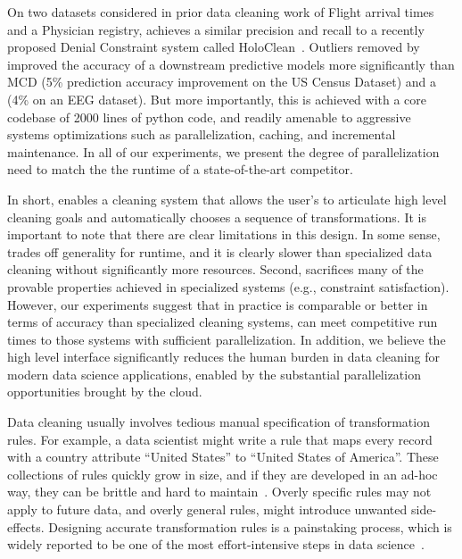 On two datasets considered in prior data cleaning work of Flight arrival times and a Physician registry, \sys achieves a similar precision and recall to a recently proposed Denial Constraint system called HoloClean~\cite{rekatsinas2017holoclean}. 
Outliers removed by \sys  improved the accuracy of a downstream predictive models more significantly than MCD (5\% prediction accuracy improvement on the US Census Dataset) and a (4\% on an EEG dataset). 
But more importantly, this is achieved with a core codebase of 2000 lines of python code, and readily amenable to aggressive systems optimizations such as parallelization, caching, and incremental maintenance.
In all of our experiments, we present the degree of parallelization need to match the the runtime of a state-of-the-art competitor.

In short, \sys enables a cleaning system that allows the user's to articulate high level cleaning goals and automatically chooses a sequence of transformations.  
It is important to note that there are clear limitations in this design.
In some sense, \sys trades off generality for runtime, and it is clearly slower than specialized data cleaning without significantly more resources.
Second, \sys sacrifices many of the provable properties achieved in specialized systems (e.g., constraint satisfaction). 
However, our experiments suggest that in practice \sys is comparable or better in terms of accuracy than specialized cleaning systems, can meet competitive run times to those systems with sufficient parallelization. In addition, we believe the high level interface significantly reduces the human burden in data cleaning for modern data science applications, enabled by the substantial parallelization opportunities brought by the cloud. 





Data cleaning usually involves tedious manual specification of transformation rules.
For example, a data scientist might write a rule that maps every record with a \textsf{country} attribute ``United States'' to ``United States of America''.
These collections of rules quickly grow in size, and if they are developed in an ad-hoc way, they can be brittle and hard to maintain~\cite{krishnan2016hilda}.
Overly specific rules may not apply to future data, and overly general rules, might introduce unwanted side-effects.
Designing accurate transformation rules is a painstaking process, which is widely reported to be one of the most effort-intensive steps in data science~\cite{nytimes}.

